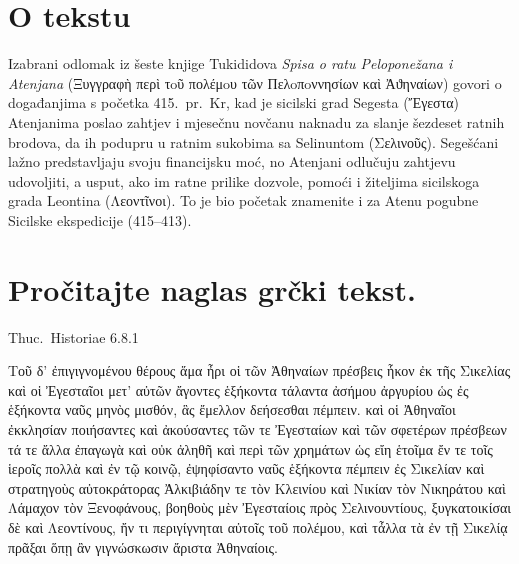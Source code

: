 


\section*{O tekstu}

Izabrani odlomak iz šeste knjige Tukididova \textit{Spisa o ratu Peloponežana i Atenjana} \textgreek[variant=ancient]{(Ξυγγραφὴ περὶ τoῦ πολέμoυ τῶν Пελoπoννησίων καὶ Ἀϑηναίων)} govori o događanjima s početka 415.\ pr.~Kr, kad je sicilski grad Segesta \textgreek[variant=ancient]{(Ἔγεστα)} Atenjanima poslao zahtjev i mjesečnu novčanu naknadu za slanje šezdeset ratnih brodova, da ih podupru u ratnim sukobima sa Selinuntom \textgreek[variant=ancient]{(Σελινοῦς).} Segešćani lažno predstavljaju svoju financijsku moć, no Atenjani odlučuju zahtjevu udovoljiti, a usput, ako im ratne prilike dozvole, pomoći i žiteljima sicilskoga grada Leontina \textgreek[variant=ancient]{(Λεοντῖνοι).} To je bio početak znamenite i za Atenu pogubne Sicilske ekspedicije (415–413).


\section*{Pročitajte naglas grčki tekst.}


Thuc.\ Historiae 6.8.1

\medskip

{\large
\begin{greek}
\noindent Τοῦ δ' ἐπιγιγνομένου θέρους ἅμα ἦρι οἱ τῶν Ἀθηναίων πρέσβεις ἧκον ἐκ τῆς Σικελίας καὶ οἱ Ἐγεσταῖοι μετ' αὐτῶν ἄγοντες ἑξήκοντα τάλαντα ἀσήμου ἀργυρίου ὡς ἐς ἑξήκοντα ναῦς μηνὸς μισθόν, ἃς ἔμελλον δεήσεσθαι πέμπειν. καὶ οἱ Ἀθηναῖοι ἐκκλησίαν ποιήσαντες καὶ ἀκούσαντες τῶν τε Ἐγεσταίων καὶ τῶν σφετέρων πρέσβεων τά τε ἄλλα ἐπαγωγὰ καὶ οὐκ ἀληθῆ καὶ περὶ τῶν χρημάτων ὡς εἴη ἑτοῖμα ἔν τε τοῖς ἱεροῖς πολλὰ καὶ ἐν τῷ κοινῷ, ἐψηφίσαντο ναῦς ἑξήκοντα πέμπειν ἐς Σικελίαν καὶ στρατηγοὺς αὐτοκράτορας Ἀλκιβιάδην τε τὸν Κλεινίου καὶ Νικίαν τὸν Νικηράτου καὶ Λάμαχον τὸν Ξενοφάνους, βοηθοὺς μὲν Ἐγεσταίοις πρὸς Σελινουντίους, ξυγκατοικίσαι δὲ καὶ Λεοντίνους, ἤν τι περιγίγνηται αὐτοῖς τοῦ πολέμου, καὶ τἆλλα τὰ ἐν τῇ Σικελίᾳ πρᾶξαι ὅπῃ ἂν γιγνώσκωσιν ἄριστα Ἀθηναίοις.


\end{greek}

}


